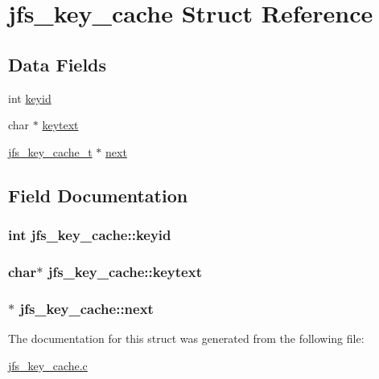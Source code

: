 \hypertarget{structjfs__key__cache}{
\section{jfs\_\-key\_\-cache Struct Reference}
\label{structjfs__key__cache}
}
\subsection*{Data Fields}
\begin{DoxyCompactItemize}
\item 
int \hyperlink{structjfs__key__cache_a8da203a55e9306599da618a0d0c868e9}{keyid}
\item 
char $\ast$ \hyperlink{structjfs__key__cache_a51815e9339a0f419e191ac273345f24b}{keytext}
\item 
\hyperlink{structjfs__key__cache}{jfs\_\-key\_\-cache\_\-t} $\ast$ \hyperlink{structjfs__key__cache_a358397bbbd99c2fe660d21abac77188e}{next}
\end{DoxyCompactItemize}


\subsection{Field Documentation}
\hypertarget{structjfs__key__cache_a8da203a55e9306599da618a0d0c868e9}{
\subsubsection[{keyid}]{\setlength{\rightskip}{0pt plus 5cm}int {\bf jfs\_\-key\_\-cache::keyid}}}
\label{structjfs__key__cache_a8da203a55e9306599da618a0d0c868e9}
\hypertarget{structjfs__key__cache_a51815e9339a0f419e191ac273345f24b}{
\subsubsection[{keytext}]{\setlength{\rightskip}{0pt plus 5cm}char$\ast$ {\bf jfs\_\-key\_\-cache::keytext}}}
\label{structjfs__key__cache_a51815e9339a0f419e191ac273345f24b}
\hypertarget{structjfs__key__cache_a358397bbbd99c2fe660d21abac77188e}{
\subsubsection[{next}]{$\ast$ {\bf jfs\_\-key\_\-cache::next}}}
\label{structjfs__key__cache_a358397bbbd99c2fe660d21abac77188e}


The documentation for this struct was generated from the following file:\begin{DoxyCompactItemize}
\item 
\hyperlink{jfs__key__cache_8c}{jfs\_\-key\_\-cache.c}\end{DoxyCompactItemize}
